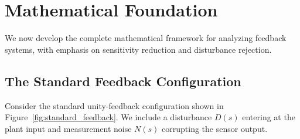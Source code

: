 \section{Mathematical Foundation}
\label{sec:mathematical_foundation}

We now develop the complete mathematical framework for analyzing feedback systems, with emphasis on sensitivity reduction and disturbance rejection.

\subsection{The Standard Feedback Configuration}

Consider the standard unity-feedback configuration shown in Figure~\ref{fig:standard_feedback}. We include a disturbance $D(s)$ entering at the plant input and measurement noise $N(s)$ corrupting the sensor output.


